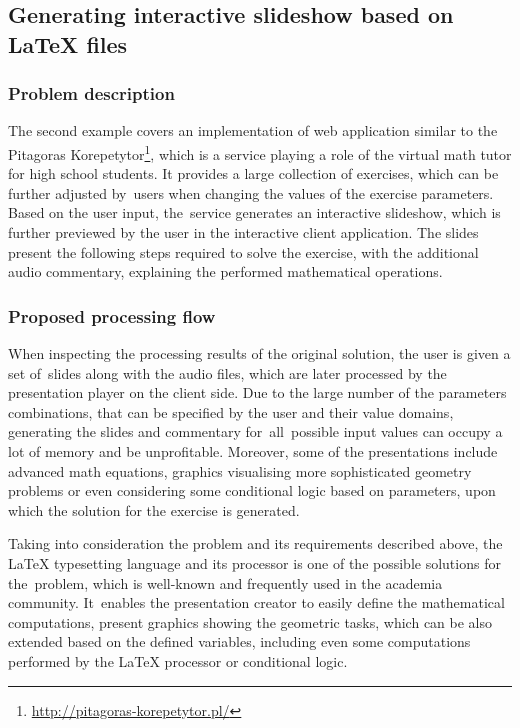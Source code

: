 \subsection{Generating interactive slideshow based on LaTeX files} \label{chapter:examples-generating-interactive-slideshow-based-on-latex-files}

\subsubsection{Problem description}

The second example covers an implementation of web application similar to the Pitagoras Korepetytor\footnote{\url{http://pitagoras-korepetytor.pl/}}, which is a service playing a role of the virtual math tutor for high school students.
It provides a large collection of exercises, which can be further adjusted by~users when changing the values of the exercise parameters.
Based on the user input, the~service generates an interactive slideshow, which is further previewed by the user in the interactive client application.
The slides present the following steps required to solve the exercise, with the additional audio commentary, explaining the performed mathematical operations.

\subsubsection{Proposed processing flow} \label{chapter:examples-generating-interactive-slideshow-based-on-latex-files-proposed-processing-flow}

When inspecting the processing results of the original solution, the user is given a set of~slides along with the audio files, which are later processed by the presentation player on the client side.
Due to the large number of the parameters combinations, that can be specified by the user and their value domains, generating the slides and commentary for~all~possible input values can occupy a lot of memory and be unprofitable.
Moreover, some of the presentations include advanced math equations, graphics visualising more sophisticated geometry problems or even considering some conditional logic based on parameters, upon which the solution for the exercise is generated.

Taking into consideration the problem and its requirements described above, the LaTeX \cite{latex} typesetting language and its processor is one of the possible solutions for the~problem, which is well-known and frequently used in the academia community.
It~enables the presentation creator to easily define the mathematical computations, present graphics showing the geometric tasks, which can be also extended based on the defined variables, including even some computations performed by the LaTeX processor or conditional logic.

